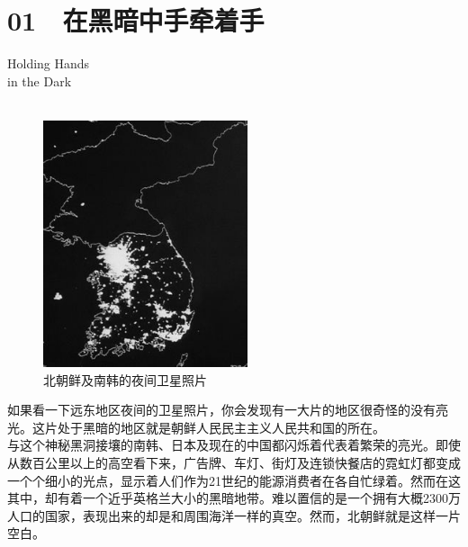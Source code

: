 \fancyhead[RO]{{\tiny{\textcolor{Gray}{\FA \ }}}\thepage}
\fancyhead[LE]{{\tiny{\textcolor{Gray}{\FA \ }}}\thepage}
\fancyfoot[LE,RO]{}
\fancyfoot[LO,CE]{}
\fancyfoot[CO,RE]{}
\chapter*{01 {\FA } 在黑暗中手牵着手}
\begin{flushright}
	\textcolor{PinYinColor}{\EN \huge{Holding Hands\\
		in the Dark\\
	\ \\}}
\end{flushright}
\begin{figure}[!htbp]
	\centering
	\includegraphics[width=6cm]{./Chapters/Images/01.jpg}
	\caption*{北朝鲜及南韩的夜间卫星照片}
\end{figure}

如果看一下远东地区夜间的卫星照片，你会发现有一大片的地区很奇怪的没有亮光。这片处于黑暗的地区就是朝鲜人民民主主义人民共和国的所在。\\

与这个神秘黑洞接壤的南韩、日本及现在的中国都闪烁着代表着繁荣的亮光。即使从数百公里以上的高空看下来，广告牌、车灯、街灯及连锁快餐店的霓虹灯都变成一个个细小的光点，显示着人们作为21世纪的能源消费者在各自忙绿着。然而在这其中，却有着一个近乎英格兰大小的黑暗地带。难以置信的是一个拥有大概2300万人口的国家，表现出来的却是和周围海洋一样的真空。然而，北朝鲜就是这样一片空白。\\

